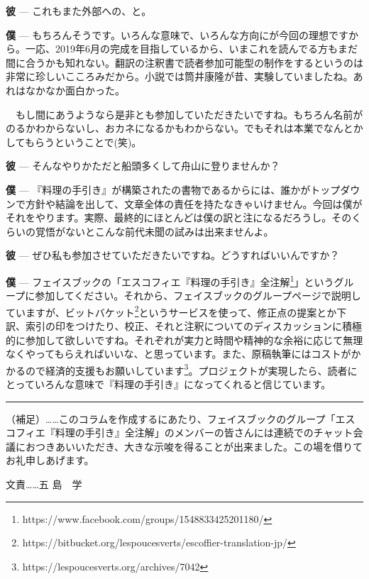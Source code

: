 \documentclass[14Q,]{ltjsbook}
\makeatletter
\renewcommand{\ldots}{\noindent…}
\let\footnotes@ve=\footnote
\def\footnote{\inhibitglue\footnotes@ve}
\makeatother
\begin{document}
\textbf{彼} --- これもまた外部への、と。

\textbf{僕} ---
もちろんそうです。いろんな意味で、いろんな方向にが今回の理想ですから。一応、2019年6月の完成を目指しているから、いまこれを読んでる方もまだ間に合うかも知れない。翻訳の注釈書で読者参加可能型の制作をするというのは非常に珍しいこころみだから。小説では筒井康隆が昔、実験していましたね。あれはなかなか面白かった。

　もし間にあうようなら是非とも参加していただきたいですね。もちろん名前がのるかわからないし、おカネになるかもわからない。でもそれは本業でなんとかしてもらうということで(笑)。

\textbf{彼} --- そんなやりかただと船頭多くして舟山に登りませんか？

\textbf{僕} ---
『料理の手引き』が構築されたの書物であるからには、誰かがトップダウンで方針や結論を出して、文章全体の責任を持たなきゃいけません。今回は僕がそれをやります。実際、最終的にほとんどは僕の訳と注になるだろうし。そのくらいの覚悟がないとこんな前代未聞の試みは出来ませんよ。

\textbf{彼} ---
ぜひ私も参加させていただきたいですね。どうすればいいんですか？

\textbf{僕} ---
フェイスブックの「エスコフィエ『料理の手引き』全注解\footnote{https://www.facebook.com/groups/1548833425201180/}」というグループに参加してください。それから、フェイスブックのグループページで説明していますが、ビットバケット\footnote{https://bitbucket.org/lespoucesverts/escoffier-translation-jp/}というサービスを使って、修正点の提案とか下訳、索引の印をつけたり、校正、それと注釈についてのディスカッションに積極的に参加して欲しいですね。それぞれが実力と時間や精神的な余裕に応じて無理なくやってもらえればいいな、と思っています。また、原稿執筆にはコストがかかるので経済的支援もお願いしています\footnote{https://lespoucesverts.org/archives/7042}。プロジェクトが実現したら、読者にとっていろんな意味で『料理の手引き』になってくれると信じています。

\begin{center}\rule{0.5\linewidth}{\linethickness}\end{center}

（補足）\ldots{}\ldots{}このコラムを作成するにあたり、フェイスブックのグループ「エスコフィエ『料理の手引き』全注解」のメンバーの皆さんには連続でのチャット会議におつきあいいただき、大きな示唆を得ることが出来ました。この場を借りてお礼申しあげます。

文責\ldots{}\ldots{}五 島　学

\backmatter



\renewcommand{\indexname}{総索引}
\printindex
\end{document}
